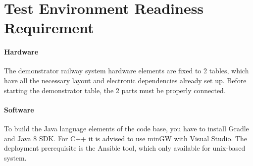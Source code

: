 \section{Test Environment Readiness Requirement}
\paragraph{Hardware} The demonstrator railway system hardware elements are fixed to 2 tables, which have all the necessary layout and electronic dependencies already set up. Before starting the demonstrator table, the 2 parts must be properly connected. 
\paragraph{Software} To build the Java language elements of the code base, you have to install Gradle and Java 8 SDK. For C++ it is advised to use minGW with Visual Studio. The deployment prerequisite is the Ansible tool, which only available for unix-based system.
